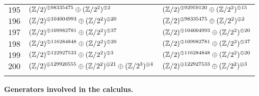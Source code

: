 \begin{supertabular}{|c|p{5.5cm}|p{5.5cm}|}
$195$%
&$(\mathbb{Z}/2)^{\oplus98335475}\oplus(\mathbb{Z}/2^{2})^{\oplus2}$%
&$(\mathbb{Z}/2)^{\oplus92959120}\oplus(\mathbb{Z}/2^{2})^{\oplus15}$\\

$196$%
&$(\mathbb{Z}/2)^{\oplus104004993}\oplus(\mathbb{Z}/2^{2})^{\oplus20}$%
&$(\mathbb{Z}/2)^{\oplus98335475}\oplus(\mathbb{Z}/2^{2})^{\oplus2}$\\

$197$%
&$(\mathbb{Z}/2)^{\oplus109982781}\oplus(\mathbb{Z}/2^{2})^{\oplus37}$%
&$(\mathbb{Z}/2)^{\oplus104004993}\oplus(\mathbb{Z}/2^{2})^{\oplus20}$\\

$198$%
&$(\mathbb{Z}/2)^{\oplus116284848}\oplus(\mathbb{Z}/2^{2})^{\oplus20}$%
&$(\mathbb{Z}/2)^{\oplus109982781}\oplus(\mathbb{Z}/2^{2})^{\oplus37}$\\

$199$%
&$(\mathbb{Z}/2)^{\oplus122927533}\oplus(\mathbb{Z}/2^{2})^{\oplus3}$%
&$(\mathbb{Z}/2)^{\oplus116284848}\oplus(\mathbb{Z}/2^{2})^{\oplus20}$\\

$200$%
&$(\mathbb{Z}/2)^{\oplus129920555}\oplus(\mathbb{Z}/2^{2})^{\oplus21}\oplus(\mathbb{Z}/2^{3})^{\oplus4}$%
&$(\mathbb{Z}/2)^{\oplus122927533}\oplus(\mathbb{Z}/2^{2})^{\oplus3}$\\

&&\\\end{supertabular}
\newpage

{\bf Generators involved in the calculus.\\}\label{subsection:Admissible Words Involved in the Calculus of K(Z/2,3)}

